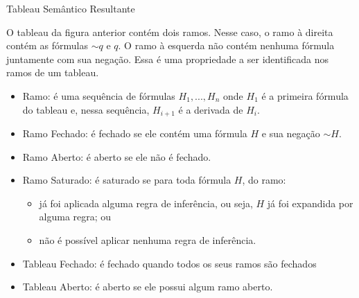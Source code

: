 \begin{frame}{Tableau Semântico Resultante}
\centering
{}   
\end{frame}
\begin{frame}{}
O tableau da figura anterior contém dois ramos. Nesse caso, o ramo à direita contém as fórmulas $\sim q$ e $q$. O ramo à esquerda não contém nenhuma fórmula juntamente com sua negação. Essa é uma propriedade a ser identificada nos ramos de um tableau.
\begin{itemize}
\item Ramo: é uma sequência de fórmulas $H_1,...,H_n$ onde $H_1$ é a primeira fórmula do tableau e, nessa sequência, $H_{i+1}$ é a derivada de $H_i$.
\item Ramo Fechado: é fechado se ele contém uma fórmula $H$ e sua negação $\sim H$.
\item Ramo Aberto: é aberto se ele não é fechado.
\end{itemize}
\end{frame}
\begin{frame}
	\begin{itemize}
	    \item Ramo Saturado: é saturado se para toda fórmula $H$, do ramo:
			\begin{itemize}
       	\item já foi aplicada alguma regra de inferência, ou seja, $H$ já   			  foi expandida por alguma regra; ou
	    \item não é possível aplicar nenhuma regra de inferência.
    \end{itemize}
    	\item Tableau Fechado: é fechado quando todos os seus ramos são         	      fechados
        \item Tableau Aberto: é aberto se ele possui algum ramo aberto.
    \end{itemize}
\end{frame}
